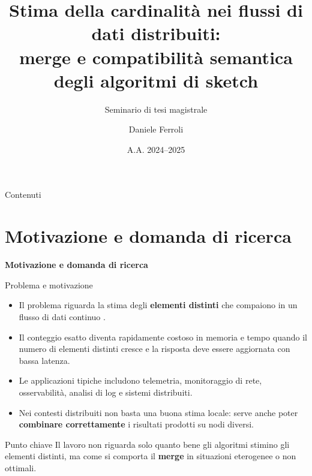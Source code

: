 \documentclass[aspectratio=169,11pt]{beamer}
\title[Stima della cardinalit\`a nei flussi di dati distribuiti]{Stima della cardinalit\`a nei flussi di dati distribuiti:\\merge e compatibilit\`a semantica degli algoritmi di sketch}
\subtitle{Seminario di tesi magistrale}
\author{Daniele Ferroli}
\institute{Universit\`a degli Studi di Udine}
\date{A.A. 2024--2025}
\begin{document}
\begin{frame}
  \titlepage
\end{frame}

\begin{frame}{Contenuti}
  \tableofcontents
\end{frame}

\section{Motivazione e domanda di ricerca}

\begin{frame}[plain]
  \centering
  \vfill
  {\LARGE\bfseries Motivazione e domanda di ricerca}
  \vfill
\end{frame}

\begin{frame}{Problema e motivazione}
  \begin{itemize}
    \item Il problema riguarda la stima degli \textbf{elementi distinti} che compaiono in un flusso di dati continuo \cite{Muthukrishnan_2005,BarYossef_Jayram_Kumar_Sivakumar_Trevisan_2002}.
    \item Il conteggio esatto diventa rapidamente costoso in memoria e tempo quando il numero di elementi distinti cresce e la risposta deve essere aggiornata con bassa latenza.
    \item Le applicazioni tipiche includono telemetria, monitoraggio di rete, osservabilit\`a, analisi di log e sistemi distribuiti.
    \item Nei contesti distribuiti non basta una buona stima locale: serve anche poter \textbf{combinare correttamente} i risultati prodotti su nodi diversi.
  \end{itemize}

  \begin{alertblock}{Punto chiave}
    Il lavoro non riguarda solo quanto bene gli algoritmi stimino gli elementi distinti, ma come si comporta il \textbf{merge} in situazioni eterogenee o non ottimali.
  \end{alertblock}
\end{frame}
\end{document}
